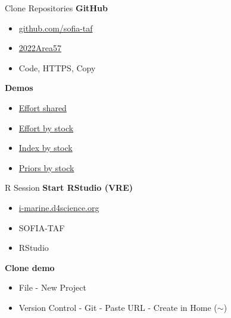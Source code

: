 \documentclass[aspectratio=169]{beamer}
\begin{document}

\begin{frame}{Clone Repositories}
  \textbf{\darkgreen GitHub}\\[0.5ex]
  \begin{itemize}\blue
    \item[] \href{https://github.com/sofia-taf}{github.com/sofia-taf}\\[1ex]
    \item[] \href{https://github.com/sofia-taf/2023Area57Demo}{2022Area57}\black
    \item[] Code, HTTPS, Copy\\[1ex]
  \end{itemize}
  \vspace{3ex}
  \textbf{\darkgreen Demos}\\[0.5ex]
  \begin{itemize}\blue
    \item[] \href{https://github.com/sofia-taf/2022Area31DemoEffortShared}%
    {Effort shared}\\[1ex]
    \item[] \href{https://github.com/sofia-taf/2022Area31DemoEffortByStock}%
    {Effort by stock}\\[1ex]
    \item[] \href{https://github.com/sofia-taf/2022Area31DemoIndexByStock}%
    {Index by stock}\\[1ex]
    \item[] \href{https://github.com/sofia-taf/2022Area41DemoPriorsByStock}%
    {Priors by stock}
  \end{itemize}
\end{frame}


\begin{frame}{R Session}
  \textbf{\darkgreen Start RStudio (VRE)}\\[0.3ex]
  \begin{itemize}
    \item[] {\blue\href{https://i-marine.d4science.org/}%
      {i-marine.d4science.org}}\\[1ex]
    \item[] SOFIA-TAF\\[1ex]
    \item[] RStudio\\[1ex]
  \end{itemize}
  \vspace{4ex}
  \textbf{\darkgreen Clone demo}\\[0.3ex]
  \begin{itemize}
    \item[] File - New Project\\[1ex]
    \item[] Version Control - Git - Paste URL - Create in Home ($\sim$)\\[1ex]
  \end{itemize}
\end{frame}
\end{document}
